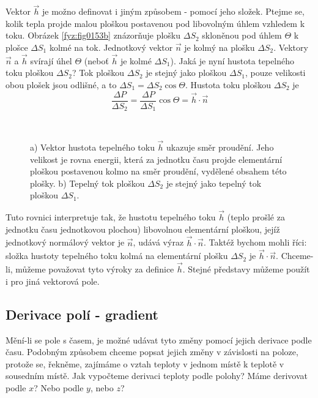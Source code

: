       Vektor $\vec{h}$ je možno definovat i jiným způsobem - pomocí jeho složek. Ptejme se, kolik 
      tepla projde malou ploškou postavenou pod libovolným úhlem vzhledem k toku. Obrázek 
      \ref{fyz:fig0153b} znázorňuje plošku $\Delta S_2$ skloněnou pod úhlem $\Theta$ k plošce 
      $\Delta S_1$ kolmé na tok. Jednotkový vektor $\vec{n}$ je kolmý na plošku $\Delta S_2$. 
      Vektory $\vec{n}$ a $\vec{h}$ svírají úhel $\Theta$ (neboť $\vec{h}$ je kolmé $\Delta 
      S_1$). Jaká je nyní hustota tepelného toku ploškou $\Delta S_2$? Tok ploškou $\Delta S_2$ je 
      stejný jako ploškou $\Delta S_1$, pouze velikosti obou plošek jsou odlišné, a to $\Delta 
      S_1=\Delta S_2\cos\Theta$. Hustota toku ploškou $\Delta S_2$ je 
      \begin{equation}\label{fyz:eq248}
        \frac{\Delta P}{\Delta S_2}=\frac{\Delta P}{\Delta S_1}\cos{\Theta}=\vec{h}\cdot\vec{n}
      \end{equation}
  
      \begin{figure}[ht!]
        \centering
         \\                                          
        \caption{a) Vektor hustota tepelného toku $\vec{h}$ ukazuje směr proudění. Jeho velikost
                  je rovna energii, která za jednotku času projde elementární ploškou postavenou 
                  kolmo na směr proudění, vydělené obsahem této plošky. b) Tepelný tok ploškou 
                  $\Delta S_2$ je stejný jako tepelný tok ploškou $\Delta S_1$.
                  \cite[s.~30]{Feynman02}}
        \label{fyz:fig0153}
      \end{figure}
      
      Tuto rovnici interpretuje tak, že hustotu tepelného toku $\vec{h}$ (teplo prošlé za jednotku 
      času jednotkovou plochou) libovolnou elementární ploškou, jejíž jednotkový normálový vektor 
      je $\vec{n}$, udává výraz $\vec{h}\cdot\vec{n}$. Taktéž bychom mohli říci: složka hustoty 
      tepelného toku kolmá na elementární plošku $\Delta S_2$ je $\vec{h}\cdot\vec{n}$. Chceme-li, 
      můžeme považovat tyto výro\-ky za definice $\vec{h}$. Stejné představy můžeme použít i pro 
      jiná vektorová pole.
          
    \subsection{Derivace polí - gradient}\label{fyz:IIchapIIsecIV}
      Mění-li se pole s časem, je možné udávat tyto změny pomocí jejich derivace podle času. Podobným 
      způsobem chceme popsat jejich změny v závislosti na poloze, protože se, řekněme, zajímáme o 
      vztah teploty v jednom místě k teplotě v sousedním místě. Jak vypočteme derivaci teploty podle 
      polohy? Máme derivovat podle \(x\)? Nebo podle \(y\), nebo $z$?
    
